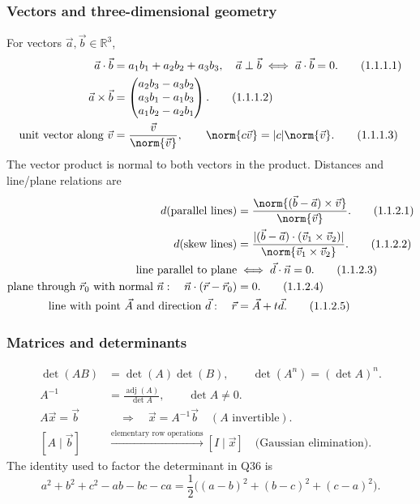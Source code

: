 \subsubsection{Vectors and three-dimensional geometry}
For vectors $\vec a,\vec b\in\mathbb R^3$,
\begin{align}
\vec a\cdot\vec b&=a_1b_1+a_2b_2+a_3b_3,\quad \vec a\perp\vec b\iff \vec a\cdot\vec b=0. \tag{1.1.1.1}\\
\vec a\times\vec b&=\begin{pmatrix}a_2b_3-a_3b_2\\a_3b_1-a_1b_3\\a_1b_2-a_2b_1\end{pmatrix}. \tag{1.1.1.2}\\
\text{unit vector along }\vec v&=\frac{\vec v}{\norm{\vec v}},\qquad \norm{c\vec v}=|c|\norm{\vec v}. \tag{1.1.1.3}
\end{align}
The vector product is normal to both vectors in the product. Distances and line/plane relations are
\begin{align}
d(\text{parallel lines})&=\frac{\norm{(\vec b-\vec a)\times\vec v}}{\norm{\vec v}}. \tag{1.1.2.1}\\
d(\text{skew lines})&=\frac{|(\vec b-\vec a)\cdot(\vec v_1\times\vec v_2)|}{\norm{\vec v_1\times\vec v_2}}. \tag{1.1.2.2}\\
\text{line parallel to plane}&\iff \vec d\cdot\vec n=0. \tag{1.1.2.3}\\
\text{plane through }\vec r_0\text{ with normal }\vec n:\quad \vec n\cdot(\vec r-\vec r_0)&=0. \tag{1.1.2.4}\\
\text{line with point }\vec A\text{ and direction }\vec d:\quad \vec r&=\vec A+t\vec d. \tag{1.1.2.5}
\end{align}

\subsubsection{Matrices and determinants}
\begin{align}
\det(AB)&=\det(A)\det(B),\qquad \det(A^n)=(\det A)^n. \tag{1.2.1.1}\\
A^{-1}&=\frac{\operatorname{adj}(A)}{\det A},\qquad \det A\ne0. \tag{1.2.1.2}\\
A\vec x=\vec b&\quad\Longrightarrow\quad \vec x=A^{-1}\vec b\quad(A\text{ invertible}). \tag{1.2.1.3}\\
[A\mid \vec b]&\xrightarrow{\text{elementary row operations}}[I\mid\vec x]\quad\text{(Gaussian elimination)}. \tag{1.2.1.4}
\end{align}
The identity used to factor the determinant in Q36 is
\[
a^2+b^2+c^2-ab-bc-ca=\frac12\bigl((a-b)^2+(b-c)^2+(c-a)^2\bigr).\tag{1.2.2.1}
\]

